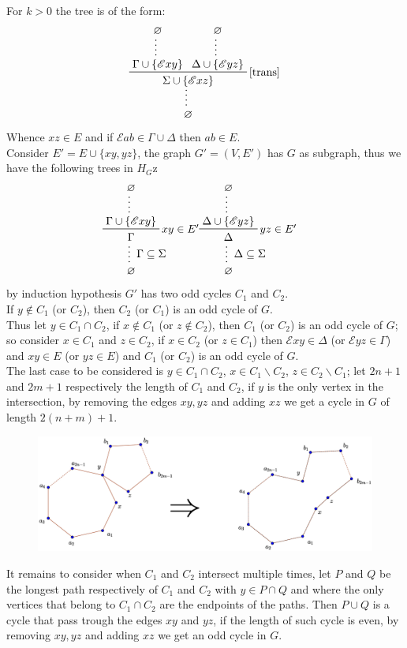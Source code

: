 \documentclass[a4paper,12pt,twoside]{book}
\newcommand{\E}{\mathscr{E}}
\let\emptyset\varnothing
\begin{document}
For $k >0$ the tree is of the form:
$$
\prftree[r]{\ref{trans}}
{\prfsummary{\emptyset}{\Gamma \cup \{\E xy \}}}
{\prfsummary{\emptyset}{\Delta \cup \{\E yz \}}}
{\prfsummary{\Sigma \cup \{\E xz \}}{\emptyset}}
$$
Whence $xz\in E$ and if $\E ab \in \Gamma\cup\Delta$ then $ab\in E$.\\
Consider $E'=E\cup\{xy,yz\}$, the graph $G'=(V,E' )$ has $G$ as subgraph, thus we have the following trees in $H_G$z
\begin{eqnarray*}
\prfsummary[$\Gamma \subseteq \Sigma$]{
\prftree[r]{$xy \in E'$}{\prfsummary{\emptyset}{\Gamma \cup\{\E xy\}}}{\Gamma}}
{\emptyset}
&\prfsummary[$\Delta \subseteq \Sigma$]{
\prftree[r]{$yz \in E'$}{\prfsummary{\emptyset}{\Delta \cup\{\E yz\}}}{\Delta}}
{\emptyset}
\end{eqnarray*}
by induction hypothesis $G'$ has two odd cycles $C_1$ and $C_2$.
\\If $y \notin C_1$ (or $C_2$), then $C_2$ (or $C_1$) is an odd cycle of $G$.
\\Thus let $y\in C_1\cap C_2$, if $x\notin C_1$ (or $z\notin C_2$), then $C_1$ (or $C_2$) is an odd cycle of $G$;
\\so consider $x\in C_1$ and $z\in C_2$, if $x\in C_2$ (or $z\in C_1$) then $\E xy \in \Delta$ (or $\E yz \in \Gamma$) and $xy\in E$ (or $yz\in E$) and $C_1$ (or $C_2$) is an odd cycle of $G$.
\\ The last case to be considered is  $y\in C_1\cap C_2$, $x\in C_1 \backslash C_2$, 
$z\in C_2 \backslash C_1$; let $2n+1$ and $2m+1$ respectively the length of $C_1$ and $C_2$, if $y$ is the only vertex in the intersection,	 by removing the edges $xy,yz$ and adding $xz$ we get a cycle in $G$ of length $2(n+m)+1$. 
\begin{figure}[h]
\includegraphics[scale=0.25]{oddcycles1.eps}
\end{figure}

It remains to consider when $C_1$ and $C_2$ intersect multiple times, let $P$ and $Q$ be the longest path respectively of $C_1$ and $C_2$ with $y\in P\cap Q$ and where the only vertices that belong to $C_1\cap C_2$ are the endpoints of the paths.
Then $P\cup Q$ is a cycle that pass trough the edges $xy$ and $yz$, if the length of such cycle is even, by removing $xy,yz$ and adding $xz$ we get an odd cycle in $G$.
\end{document}

